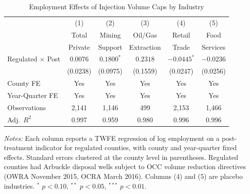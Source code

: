 \begin{table}[htbp]
\centering
\caption{Employment Effects of Injection Volume Caps by Industry}
\label{tab:main}
\begin{threeparttable}
\begin{tabular}{lccccc}
\toprule
 & (1) & (2) & (3) & (4) & (5) \\
 & Total & Mining & Oil/Gas & Retail & Food \\
 & Private & Support & Extraction & Trade & Services \\
\midrule
Regulated $\times$ Post & $0.0076$ & $0.1800^{*}$ & $0.2318$ & $-0.0445^{*}$ & $-0.0236$ \\
 & (0.0238) & (0.0975) & (0.1559) & (0.0247) & (0.0256) \\
\midrule
County FE & Yes & Yes & Yes & Yes & Yes \\
Year-Quarter FE & Yes & Yes & Yes & Yes & Yes \\
Observations & 2,141 & 1,146 & 499 & 2,153 & 1,466 \\
Adj.~$R^2$ & 0.997 & 0.959 & 0.980 & 0.996 & 0.996 \\
\bottomrule
\end{tabular}
\begin{tablenotes}[flushleft]\footnotesize
\item \textit{Notes:} Each column reports a TWFE regression of log employment on a post-treatment indicator for regulated counties, with county and year-quarter fixed effects. Standard errors clustered at the county level in parentheses. Regulated counties had Arbuckle disposal wells subject to OCC volume reduction directives (OWRA November 2015, OCRA March 2016). Columns (4) and (5) are placebo industries. $^{*}$ $p<0.10$, $^{**}$ $p<0.05$, $^{***}$ $p<0.01$.
\end{tablenotes}
\end{threeparttable}
\end{table}

